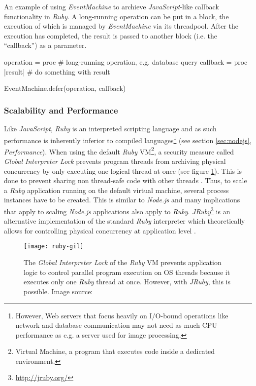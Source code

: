 \begin{program}
  \caption{An example of using \textit{EventMachine} to archieve \textit{JavaScript}-like callback functionality in \textit{Ruby}. A long-running operation can be put in a block, the execution of which is managed by \textit{EventMachine} via its threadpool. After the execution has completed, the result is passed to another block (i.e. the ``callback'') as a parameter.}
  \label{prog:ruby-defer}
  \begin{JavaCode}
operation = proc {
    # long-running operation, e.g. database query
}
callback = proc { |result|
    # do something with result
}

EventMachine.defer(operation, callback)
  \end{JavaCode}
\end{program}

\subsubsection*{Scalability and Performance}
Like \textit{JavaScript}, \textit{Ruby} is an interpreted scripting language and as such performance is inherently inferior to compiled languages\footnote{However, Web servers that focus heavily on I/O-bound operations like network and database communication may not need as much CPU performance as e.g. a server used for image processing.} (see section \ref{sec:nodejs}, \textit{Performance}). When using the default \textit{Ruby} VM\footnote{Virtual Machine, a program that executes code inside a dedicated environment.}, a security measure called \textit{Global Interpreter Lock} prevents program threads from archiving physical concurrency by only executing one logical thread at once (see figure \ref{fig:gil}). This is done to prevent sharing non thread-safe code with other threads \cite{ruby-gil}. Thus, to scale a \textit{Ruby} application running on the default virtual machine, several process instances have to be created. This is similar to \textit{Node.js} and many implications that apply to scaling \textit{Node.js} applications also apply to \textit{Ruby}. \textit{JRuby}\footnote{\url{http://jruby.org/}} is an alternative implementation of the standard \textit{Ruby} interpreter which theoretically allows for controlling physical concurrency at application level \cite{ruby-gil}.

\begin{figure}
\centering\small
\setlength{\tabcolsep}{0mm}
  \texttt{[image: ruby-gil]}
\caption{
The \textit{Global Interpreter Lock} of the \textit{Ruby} VM prevents application logic to control parallel program execution on OS threads because it executes only one \textit{Ruby} thread at once. However, with \textit{JRuby}, this is possible. Image source: \cite{ruby-gil}}
\label{fig:gil}
\end{figure}

